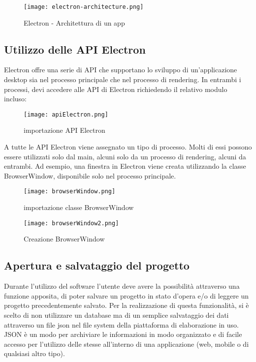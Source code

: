 \begin{figure}[H]
    \centering
    \texttt{[image: electron-architecture.png]}
    \caption{Electron - Architettura di un app}
    \label{fig:ElectronArch}
\end{figure}


\subsection{Utilizzo delle API Electron}

Electron offre una serie di API che supportano lo sviluppo di un'applicazione desktop sia nel processo principale che nel processo di rendering. In entrambi i processi, devi accedere alle API di Electron richiedendo il relativo modulo incluso:

\begin{figure}[H]
    \centering
    \texttt{[image: apiElectron.png]}
    \caption{importazione API Electron}
    \label{fig:ApiElectron}
\end{figure}

A tutte le API Electron viene assegnato un tipo di processo. Molti di essi possono essere utilizzati solo dal main, alcuni solo da un processo di rendering, alcuni da entrambi. Ad esempio, una finestra in Electron viene creata utilizzando la classe BrowserWindow, disponibile solo nel processo principale.

\begin{figure}[H]
    \centering
    \texttt{[image: browserWindow.png]}
    \caption{importazione classe BrowserWindow}
    \label{fig:BrowserWindow}
\end{figure}

\begin{figure}[H]
    \centering
    \texttt{[image: browserWindow2.png]}
    \caption{Creazione BrowserWindow}
    \label{fig:BrowserWindow2}
\end{figure}



\subsection {Apertura e salvataggio del progetto}

Durante l'utilizzo del software l'utente deve avere la possibilità attraverso una funzione apposita, di poter salvare un progetto in stato d'opera e/o di leggere un progetto precedentemente salvato.
Per la realizzazione di questa funzionalità, si è scelto di non utilizzare un database ma di un semplice salvataggio dei dati attraverso un file \Gls{json} nel file system della piattaforma di elaborazione in uso.
JSON è un modo per archiviare le informazioni in modo organizzato e di facile accesso per l'utilizzo delle stesse all'interno di una applicazione (web, mobile o di qualsiasi altro tipo).

